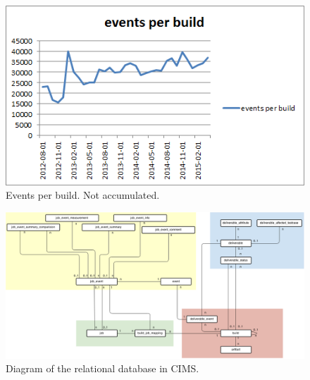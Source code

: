 \begin{figure}[h!]
\centering
\includegraphics[]{figure/events_per_build.png}
\caption{Events per build. Not accumulated.}
\label{fig:events_per_build}
\end{figure}


\begin{figure}[h!]
\centering
\includegraphics[scale=0.5, angle=90]{figure/sql.png}
\caption{Diagram of the relational database in CIMS.}
\label{fig:sql}
\end{figure}



